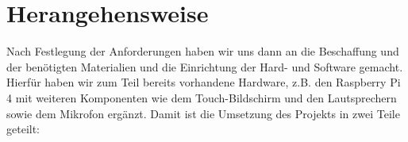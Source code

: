 \section{Herangehensweise}\label{herangehensweise}
Nach Festlegung der Anforderungen haben wir uns dann an die Beschaffung und der benötigten Materialien und die Einrichtung der Hard- und Software gemacht. 
Hierfür haben wir zum Teil bereits vorhandene Hardware, z.B. den Raspberry Pi 4 mit weiteren Komponenten wie dem Touch-Bildschirm und den Lautsprechern sowie dem Mikrofon ergänzt. 
Damit ist die Umsetzung des Projekts in zwei Teile geteilt:


\newpage
